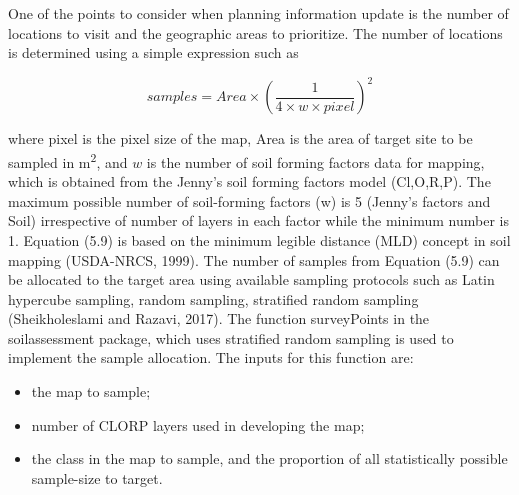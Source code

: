 \documentclass[
  10pt,
  b5paper,
]{book}
\providecommand{\tightlist}{%
  \setlength{\itemsep}{0pt}\setlength{\parskip}{0pt}}
\begin{document}
One of the points to consider when planning information update is the number of locations to visit and the geographic areas to prioritize. The number of locations is determined using a simple expression such as

\begin{equation}
\tag{5.9}
samples = Area \times (\frac{1}{4\times w \times pixel})^2
\end{equation}

where pixel is the pixel size of the map, Area is the area of target site to be sampled in m\textsuperscript{2}, and \(w\) is the number of soil forming factors data for mapping, which is obtained from the Jenny's soil forming factors model (Cl,O,R,P). The maximum possible number of soil-forming factors (w) is 5 (Jenny's factors and Soil) irrespective of number of layers in each factor while the minimum number is 1. Equation (5.9) is based on the minimum legible distance (MLD) concept in soil mapping (USDA-NRCS, 1999).
The number of samples from Equation (5.9) can be allocated to the target area using available sampling protocols such as Latin hypercube sampling, random sampling, stratified random sampling (Sheikholeslami and Razavi, 2017). The function surveyPoints in the soilassessment package, which uses stratified random sampling is used to implement the sample allocation. The inputs for this function are:

\begin{itemize}
\tightlist
\item
  the map to sample;
\item
  number of CLORP layers used in developing the map;
\item
  the class in the map to sample, and the proportion of all statistically possible sample-size to target.
\end{itemize}
\end{document}

